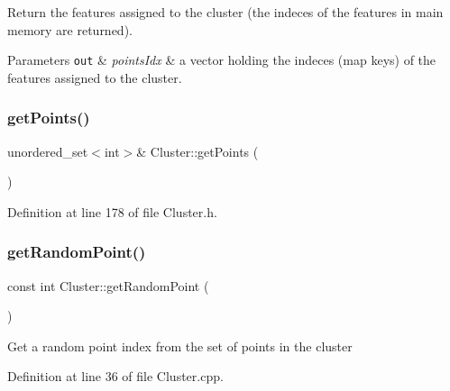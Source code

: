 Return the features assigned to the cluster (the indeces of the features in main memory are returned). 
\begin{DoxyParams}[1]{Parameters}
\mbox{\tt out}  & {\em points\+Idx} & a vector holding the indeces (map keys) of the features assigned to the cluster. \\
\hline
\end{DoxyParams}
\mbox{\label{class_cluster_a14344a9dd9efc93609344cc3fb018f37}} 
\subsubsection{\texorpdfstring{get\+Points()}{getPoints()}\hspace{0.1cm}{\footnotesize\ttfamily [2/2]}}
{\footnotesize\ttfamily unordered\+\_\+set$<$int$>$\& Cluster\+::get\+Points (\begin{DoxyParamCaption}{ }\end{DoxyParamCaption})\hspace{0.3cm}{\ttfamily [inline]}}



Definition at line 178 of file Cluster.\+h.

\mbox{\label{class_cluster_add3a7f58320774fdfcb3772b992115a0}} 
\subsubsection{\texorpdfstring{get\+Random\+Point()}{getRandomPoint()}\hspace{0.1cm}{\footnotesize\ttfamily [1/2]}}
{\footnotesize\ttfamily const int Cluster\+::get\+Random\+Point (\begin{DoxyParamCaption}{ }\end{DoxyParamCaption})}

Get a random point index from the set of points in the cluster 

Definition at line 36 of file Cluster.\+cpp.

\mbox{\label{class_cluster_aab876ab329ebaa1c4baaac5bf5dadcbf}} 
